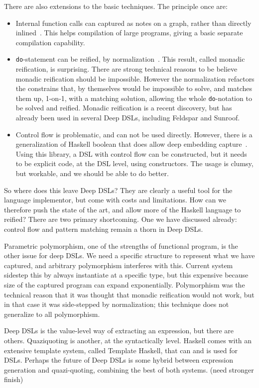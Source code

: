 \documentclass[11pt]{article}
\begin{document}
\noindent
There are also extensions to the basic techniques. The principle once are:
\begin{itemize}
\item Internal function calls can captured as notes on a graph, 
rather than directly inlined~\cite{Mainland:10:Nikola}. 
This helps compilation of large programs, giving a basic separate compilation capability.
\item \verb|do|-statement can be reified, by normalization~\cite{Sculthorpe:13:ConstrainedMonad,Svenningsson:13:CompositionalMonadReification,Persson:11:GenericMonadicConstructs}. This result, called monadic
reification, is surprising. There are strong technical reasons to be believe monadic reification
should be impossible. However the normalization refactors the constrains that, by themselves would
be impossible to solve, and matches them up, 1-on-1, with a matching solution, allowing the whole
\verb|do|-notation to be solved and reified.
Monadic reification is a recent discovery, but has already been used in several Deep DSLs,
including Feldspar\cite{Axelsson:2010:DandI-Feldspar} and Sunroof\cite{Bracker:14:Sunroof}.
\item Control flow is problematic, and can not be used directly. However,
there is a generalization of Haskell boolean that does allow deep embedding capture~\cite{hackage:boolean}.
Using this library, a DSL with control flow can be constructed, but it needs to be explicit
code, at the DSL level, using constructors. The usage is clumsy, but workable, and we should
be able to do better.
\end{itemize}

So where does this leave Deep DSLs? They are clearly a useful tool for the
language implementor, but come with costs and limitations. How can we therefore
push the state of the art, and allow more of the Haskell language to reified?
There are two primary shortcoming.
One we have discussed already: control flow and pattern matching remain a thorn in Deep DSLs. 

Parametric polymorphism, one of the strengths of functional program, is the other
issue for deep DSLs. We need a specific structure to represent what we have captured,
and arbitrary polymorphism interferes with this. Current system sidestep this
by always instantiate at a specific type, but this expensive because size of
the captured program can expand exponentially.
Polymorphism was the technical reason that it was thought that monadic reification
would not work, but in that case it was side-stepped by normalization; this technique
does not generalize to all polymorphism.

Deep DSLs is the value-level way of extracting an expression, but there are others.
Quaziquoting is another, at the syntactically level. Haskell comes with an extensive
template system, called Template Haskell, that can and is used for DSLs.
Perhaps the future of Deep DSLs is some hybrid between expression generation
and quazi-quoting, combining the best of both systems. (need stronger finish)

{}

\end{document}
